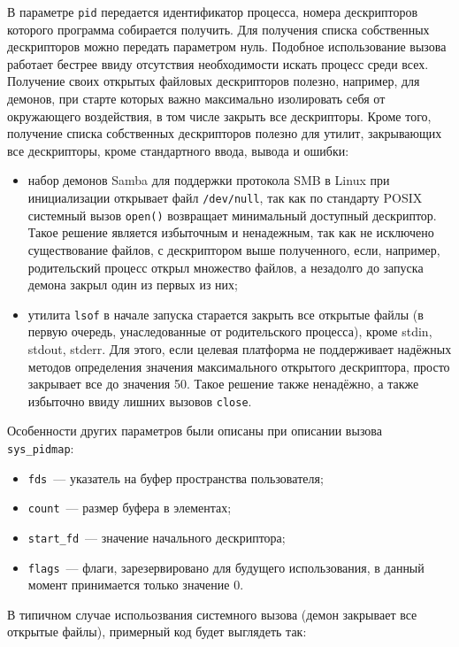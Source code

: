 В параметре \texttt{pid} передается идентификатор процесса, номера дескрипторов
которого программа собирается получить. Для получения списка собственных
дескрипторов можно передать параметром нуль. Подобное использование вызова
работает бестрее ввиду отсутствия необходимости искать процесс среди всех.
Получение своих открытых файловых дескрипторов полезно, например, для демонов,
при старте которых важно максимально изолировать себя от окружающего
воздействия, в том числе закрыть все дескрипторы. Кроме того, получение списка
собственных дескрипторов полезно для утилит, закрывающих все дескрипторы, кроме
стандартного ввода, вывода и ошибки:
\begin{itemize}
\item набор демонов Samba для поддержки протокола SMB в Linux при инициализации
  открывает файл \texttt{/dev/null}, так как по стандарту POSIX системный вызов
  \texttt{open()} возвращает минимальный доступный дескриптор. Такое решение
  является избыточным и ненадежным, так как не исключено существование файлов, с
  дескриптором выше полученного, если, например, родительский процесс открыл
  множество файлов, а незадолго до запуска демона закрыл один из первых из них;
\item утилита \texttt{lsof} в начале запуска старается закрыть все открытые
  файлы (в первую очередь, унаследованные от родительского процесса), кроме
  stdin, stdout, stderr. Для этого, если целевая платформа не поддерживает
  надёжных методов определения значения максимального открытого дескриптора,
  просто закрывает все до значения 50. Такое решение также ненадёжно, а также
  избыточно ввиду лишних вызовов \texttt{close}.
\end{itemize}

Особенности других параметров были описаны при описании вызова
\texttt{sys\_pidmap}:
\begin{itemize}
\item \texttt{fds}~--- указатель на буфер пространства пользователя;
\item \texttt{count}~--- размер буфера в элементах;
\item \texttt{start\_fd}~--- значение начального дескриптора;
\item \texttt{flags}~--- флаги, зарезервировано для будущего использования,
  в данный момент принимается только значение 0.
\end{itemize}

В типичном случае испольозвания системного вызова (демон закрывает все открытые
файлы), примерный код будет выглядеть так:

